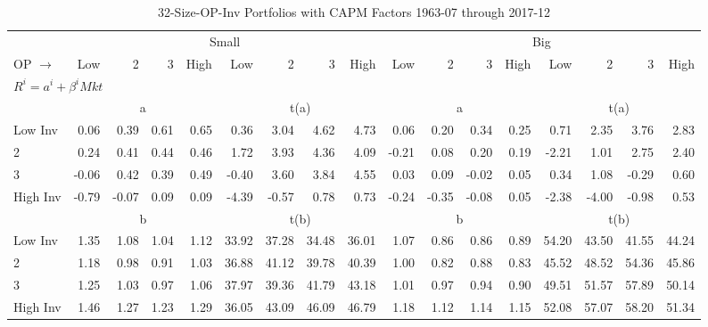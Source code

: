 
\begin{table}[!ht]
\footnotesize
\centering
\caption{32-Size-OP-Inv Portfolios with CAPM Factors 1963-07 through 2017-12}
\begin{tabular}{lrrrrrrrrrrrrrrrr}
  \toprule
    & \multicolumn{8}{c}{Small} & \multicolumn{8}{c}{Big} \\
      \cmidrule(r){2-9} \cmidrule(r){10-17}
    OP $\rightarrow$ & Low & 2 & 3 & High & Low & 2 & 3 & High & Low & 2 & 3 & High & Low & 2 & 3 & High \\ 
  \midrule
  \multicolumn{17}{l}{$R^i=a^i+\beta^iMkt$} \\

  
    
      & \multicolumn{4}{c}{a} & \multicolumn{4}{c}{t(a)}
    
      & \multicolumn{4}{c}{a} & \multicolumn{4}{c}{t(a)}
    
    \\
      \cmidrule(r){2-5} \cmidrule(r){6-9} \cmidrule(r){10-13} \cmidrule(r){14-17}

    Low Inv   & 0.06  & 0.39  & 0.61  & 0.65  & 0.36  & 3.04  & 4.62  & 4.73  & 0.06  & 0.20  & 0.34  & 0.25  & 0.71  & 2.35  & 3.76  & 2.83  \\
           2  & 0.24  & 0.41  & 0.44  & 0.46  & 1.72  & 3.93  & 4.36  & 4.09  & -0.21  & 0.08  & 0.20  & 0.19  & -2.21  & 1.01  & 2.75  & 2.40  \\
           3  & -0.06  & 0.42  & 0.39  & 0.49  & -0.40  & 3.60  & 3.84  & 4.55  & 0.03  & 0.09  & -0.02  & 0.05  & 0.34  & 1.08  & -0.29  & 0.60  \\
    High Inv  & -0.79  & -0.07  & 0.09  & 0.09  & -4.39  & -0.57  & 0.78  & 0.73  & -0.24  & -0.35  & -0.08  & 0.05  & -2.38  & -4.00  & -0.98  & 0.53  \\

  
    
      & \multicolumn{4}{c}{b} & \multicolumn{4}{c}{t(b)}
    
      & \multicolumn{4}{c}{b} & \multicolumn{4}{c}{t(b)}
    
    \\
      \cmidrule(r){2-5} \cmidrule(r){6-9} \cmidrule(r){10-13} \cmidrule(r){14-17}

    Low Inv   & 1.35  & 1.08  & 1.04  & 1.12  & 33.92  & 37.28  & 34.48  & 36.01  & 1.07  & 0.86  & 0.86  & 0.89  & 54.20  & 43.50  & 41.55  & 44.24  \\
           2  & 1.18  & 0.98  & 0.91  & 1.03  & 36.88  & 41.12  & 39.78  & 40.39  & 1.00  & 0.82  & 0.88  & 0.83  & 45.52  & 48.52  & 54.36  & 45.86  \\
           3  & 1.25  & 1.03  & 0.97  & 1.06  & 37.97  & 39.36  & 41.79  & 43.18  & 1.01  & 0.97  & 0.94  & 0.90  & 49.51  & 51.57  & 57.89  & 50.14  \\
    High Inv  & 1.46  & 1.27  & 1.23  & 1.29  & 36.05  & 43.09  & 46.09  & 46.79  & 1.18  & 1.12  & 1.14  & 1.15  & 52.08  & 57.07  & 58.20  & 51.34  \\

  

  \bottomrule
\end{tabular}
\label{tbl:32_Size_OP_Inv_CAPM}
\end{table}